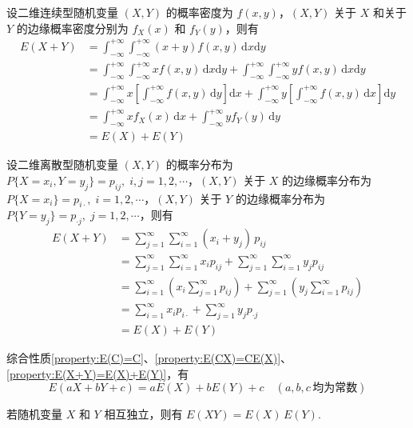 \begin{myproof}
    设二维连续型随机变量 $(X,Y)$ 的概率密度为 $f(x,y)$，$(X,Y)$ 关于 $X$ 和关于 $Y$ 的边缘概率密度分别为 $f_X(x)$ 和 $f_Y(y)$，则有
    $$
    \begin{aligned}
        E(X+Y) &= \int_{-\infty}^{+\infty} \int_{-\infty}^{+\infty} (x+y) f(x,y) \, \text{d}x \text{d}y \\
        &= \int_{-\infty}^{+\infty} \int_{-\infty}^{+\infty} x f(x,y) \, \text{d}x \text{d}y + \int_{-\infty}^{+\infty} \int_{-\infty}^{+\infty} y f(x,y) \, \text{d}x \text{d}y \\
        &= \int_{-\infty}^{+\infty} x \left[ \int_{-\infty}^{+\infty} f(x,y) \, \text{d}y \right] \text{d}x + \int_{-\infty}^{+\infty} y \left[ \int_{-\infty}^{+\infty} f(x,y) \, \text{d}x \right] \text{d}y \\
        &= \int_{-\infty}^{+\infty} x f_X(x) \, \text{d}x + \int_{-\infty}^{+\infty} y f_Y(y) \, \text{d}y \\
        &= E(X)+E(Y)
    \end{aligned}
    $$

    设二维离散型随机变量 $(X,Y)$ 的概率分布为 $P\{X=x_i,Y=y_j\} = p_{ij}, \; i,j=1,2,\cdots$，$(X,Y)$ 关于 $X$ 的边缘概率分布为 $P\{X=x_i\}=p_{i\cdot}, \; i=1,2,\cdots$，$(X,Y)$ 关于 $Y$ 的边缘概率分布为 $P\{Y=y_j\}=p_{\cdot j}, \; j=1,2,\cdots$，则有
    $$
    \begin{aligned}
        E(X+Y) &= \sum_{j=1}^{\infty} \sum_{i=1}^{\infty} (x_i + y_j) \, p_{ij} \\
        &= \sum_{j=1}^{\infty} \sum_{i=1}^{\infty} x_i p_{ij} + \sum_{j=1}^{\infty} \sum_{i=1}^{\infty} y_j p_{ij} \\
        &= \sum_{i=1}^{\infty} \left( x_i \sum_{j=1}^{\infty} p_{ij} \right) + \sum_{j=1}^{\infty} \left( y_j \sum_{i=1}^{\infty} p_{ij} \right) \\
        &= \sum_{i=1}^{\infty} x_i p_{i \cdot} + \sum_{j=1}^{\infty} y_j p_{\cdot j} \\
        &= E(X)+E(Y)
    \end{aligned}
    $$
\end{myproof}

综合性质\ref*{property:E(C)=C}、\ref*{property:E(CX)=CE(X)}、\ref*{property:E(X+Y)=E(X)+E(Y)}，有
$$
E(aX+bY+c) = aE(X) + bE(Y) + c \quad (a,b,c \, \text{均为常数})
$$

\begin{property} \label{prop:E(XY)=E(X)E(Y)}
    若随机变量 $X$ 和 $Y$ 相互独立，则有 $E(XY)=E(X) \, E(Y)$.
\end{property}

